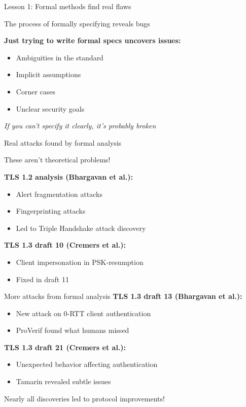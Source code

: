 \documentclass[aspectratio=169, lualatex, handout]{beamer}
\begin{document}
\begin{frame}{Lesson 1: Formal methods find real flaws}
	\begin{center}
		\Large
		The process of formally specifying reveals bugs
	\end{center}
	\vspace{1em}
	\textbf{Just trying to write formal specs uncovers issues:}
	\begin{itemize}
		\item Ambiguities in the standard
		\item Implicit assumptions
		\item Corner cases
		\item Unclear security goals
	\end{itemize}
	\vspace{0.5em}
	\begin{center}
		\textit{If you can't specify it clearly, it's probably broken}
	\end{center}
\end{frame}

\begin{frame}{Real attacks found by formal analysis}
	\begin{center}
		\Large
		These aren't theoretical problems!
	\end{center}
	\vspace{1em}
	\textbf{TLS 1.2 analysis (Bhargavan et al.):}
	\begin{itemize}
		\item Alert fragmentation attacks
		\item Fingerprinting attacks
		\item Led to Triple Handshake attack discovery
	\end{itemize}
	\vspace{0.5em}
	\textbf{TLS 1.3 draft 10 (Cremers et al.):}
	\begin{itemize}
		\item Client impersonation in PSK-resumption
		\item Fixed in draft 11
	\end{itemize}
\end{frame}

\begin{frame}{More attacks from formal analysis}
	\textbf{TLS 1.3 draft 13 (Bhargavan et al.):}
	\begin{itemize}
		\item New attack on 0-RTT client authentication
		\item ProVerif found what humans missed
	\end{itemize}
	\vspace{0.5em}
	\textbf{TLS 1.3 draft 21 (Cremers et al.):}
	\begin{itemize}
		\item Unexpected behavior affecting authentication
		\item Tamarin revealed subtle issues
	\end{itemize}
	\vspace{1em}
	\begin{center}
		\Large
		Nearly all discoveries led to protocol improvements!
	\end{center}
\end{frame}
\end{document}
